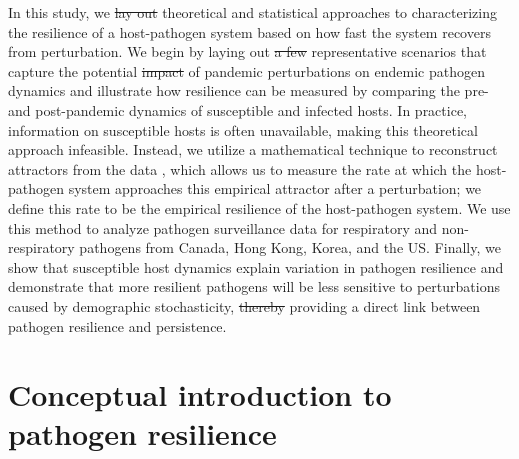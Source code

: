 \documentclass[12pt]{article}
\providecommand{\DIFaddtex}[1]{{\protect\color{blue}\uwave{#1}}} %
\providecommand{\DIFdeltex}[1]{{\protect\color{red}\sout{#1}}}                      %
\providecommand{\DIFaddbegin}{} %
\providecommand{\DIFaddend}{} %
\providecommand{\DIFdelbegin}{} %
\providecommand{\DIFdelend}{} %
\providecommand{\DIFadd}[1]{\texorpdfstring{\DIFaddtex{#1}}{#1}} %
\providecommand{\DIFdel}[1]{\texorpdfstring{\DIFdeltex{#1}}{}} %
\newcommand{\DIFscaledelfig}{0.5}
\newlength{\DIFdelgraphicswidth} %
\newlength{\DIFdelgraphicsheight} %
\newcommand{\DIFaddincludegraphics}[2][]{{\color{blue}\fbox{\DIFOincludegraphics[#1]{#2}}}} %
\newcommand{\DIFdelincludegraphics}[2][]{%
\sbox{\DIFdelgraphicsbox}{\DIFOincludegraphics[#1]{#2}}%
\settoboxwidth{\DIFdelgraphicswidth}{\DIFdelgraphicsbox} %
\settoboxtotalheight{\DIFdelgraphicsheight}{\DIFdelgraphicsbox} %
\scalebox{\DIFscaledelfig}{%
\parbox[b]{\DIFdelgraphicswidth}{\usebox{\DIFdelgraphicsbox}\\[-\baselineskip] \rule{\DIFdelgraphicswidth}{0em}}\llap{\resizebox{\DIFdelgraphicswidth}{\DIFdelgraphicsheight}{%
\setlength{\unitlength}{\DIFdelgraphicswidth}%
\begin{picture}(1,1)%
\thicklines\linethickness{2pt} %
{\color[rgb]{1,0,0}\put(0,0){\framebox(1,1){}}}%
{\color[rgb]{1,0,0}\put(0,0){\line( 1,1){1}}}%
{\color[rgb]{1,0,0}\put(0,1){\line(1,-1){1}}}%
\end{picture}%
}\hspace*{3pt}}} %
} %
\DeclareRobustCommand{\DIFaddbegin}{\DIFOaddbegin \let\includegraphics\DIFaddincludegraphics} %
\DeclareRobustCommand{\DIFaddend}{\DIFOaddend \let\includegraphics\DIFOincludegraphics} %
\DeclareRobustCommand{\DIFdelbegin}{\DIFOdelbegin \let\includegraphics\DIFdelincludegraphics} %
\DeclareRobustCommand{\DIFdelend}{\DIFOaddend \let\includegraphics\DIFOincludegraphics} %
\begin{document}
In this study, we \DIFdelbegin \DIFdel{lay out }\DIFdelend \DIFaddbegin \DIFadd{explore }\DIFaddend theoretical and statistical approaches to characterizing the resilience of a host-pathogen system based on how fast the system recovers from perturbation.
We begin by laying out \DIFdelbegin \DIFdel{a few }\DIFdelend representative scenarios that capture the potential \DIFdelbegin \DIFdel{impact }\DIFdelend \DIFaddbegin \DIFadd{impacts }\DIFaddend of pandemic perturbations on endemic pathogen dynamics and illustrate how resilience can be measured by comparing the pre- and post-pandemic dynamics of susceptible and infected hosts.
In practice, information on susceptible hosts is often unavailable, making this theoretical approach infeasible.
Instead, we utilize a mathematical technique to reconstruct attractors from the data \citep{takens2006detecting}, which allows us to measure the rate at which the host-pathogen system approaches this empirical attractor after a perturbation;
we define this rate to be the empirical resilience of the host-pathogen system.
We use this method to analyze pathogen surveillance data for respiratory and non-respiratory pathogens from Canada, Hong Kong, Korea, and the US.
Finally, we show that susceptible host dynamics explain variation in pathogen resilience and demonstrate that more resilient pathogens will be less sensitive to perturbations caused by demographic stochasticity, \DIFdelbegin \DIFdel{thereby }\DIFdelend providing a direct link between pathogen resilience and persistence. 

\section*{Conceptual introduction to pathogen resilience}
\end{document}
